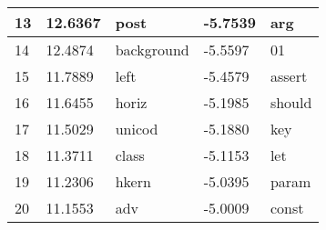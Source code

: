 \begin{table}[h]
\begin{tabular}{|l|l|l|l|l|}
13 & 12.6367  &              post  &  -5.7539  &              arg \\  \hline
14 & 12.4874  &        background  &  -5.5597  &               01 \\  \hline
15 & 11.7889  &              left  &  -5.4579  &           assert \\  \hline
16 & 11.6455  &             horiz  &  -5.1985  &           should \\  \hline
17 & 11.5029  &            unicod  &  -5.1880  &              key \\  \hline
18 & 11.3711  &             class  &  -5.1153  &              let \\  \hline
19 & 11.2306  &             hkern  &  -5.0395  &            param \\  \hline
20 & 11.1553  &               adv  &  -5.0009  &            const \\  \hline
\end{tabular}
\end{table}